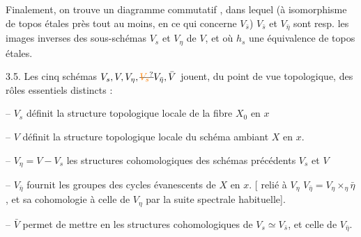Finalement, on trouve un diagramme commutatif 
,
dans lequel  (à isomorphisme de topos étales près tout au moins, en ce qui concerne $V_{\bar s}$) $V_{\bar s}$ et $V_{\bar\eta}$ sont resp. les images inverses des sous-schémas  $V_s$ et $V_\eta$ de $V$,  et où $h_s$   une équivalence de topos étales.

3.5. Les  cinq schémas  $V_s,V,V_\eta,\deleted{\unsure{V_{\bar s}}}V_{\bar\eta},\bar V$ jouent, du point de vue topologique, des rôles essentiels distincts :

 -- $V_s$ définit la structure topologique locale de la fibre $X_0$ en $x$

-- $V$ définit la structure topologique locale du schéma ambiant $X$ en $x$.

-- $V_\eta=V-V_s$   les structures cohomologiques des schémas précédents $V_s$ et $V$

-- $V_{\bar\eta}$ fournit les  groupes des  cycles évanescents de $X$ en $x$. [  relié à $V_\eta$ $V_{\bar\eta}=V_\eta\times_\eta\bar\eta$, et sa cohomologie à celle de $V_\eta$ par la suite  spectrale habituelle].

-- $\bar V$ permet de mettre en  les structures cohomologiques de $V_s\simeq V_{\bar s}$, et celle de $V_{\bar\eta}$.

